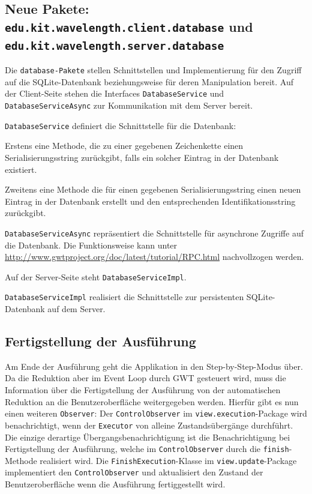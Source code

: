 \documentclass[parskip=full,11pt]{scrartcl}
\begin{document}
\subsection[Hinzugefügte Pakete]{Neue Pakete: \texttt{edu.kit.wavelength.client.database} und \texttt{edu.kit.wavelength.server.database}}

Die \texttt{database-Pakete} stellen Schnittstellen und Implementierung für den Zugriff auf die SQLite-Datenbank beziehungsweise für deren Manipulation bereit.
Auf der Client-Seite stehen die Interfaces \texttt{DatabaseService} und \texttt{DatabaseServiceAsync} zur Kommunikation mit dem Server bereit.

\texttt{DatabaseService} definiert die Schnittstelle für die Datenbank:

Erstens eine Methode, die zu einer gegebenen Zeichenkette einen Serialisierungsstring zurückgibt,
falls ein solcher Eintrag in der Datenbank existiert.

Zweitens eine Methode die für einen gegebenen Serialisierungsstring einen neuen Eintrag in der Datenbank erstellt und den entsprechenden Identifikationsstring zurückgibt.

\texttt{DatabaseServiceAsync} repräsentiert die Schnittstelle für asynchrone Zugriffe auf die Datenbank.
Die Funktionsweise kann unter \href{http://www.gwtproject.org/doc/latest/tutorial/RPC.html}{http://www.gwtproject.org/doc/latest/tutorial/RPC.html} nachvollzogen werden.

Auf der Server-Seite steht \texttt{DatabaseServiceImpl}.

\texttt{DatabaseServiceImpl} realisiert die Schnittstelle zur persistenten SQLite-Datenbank auf dem Server.
\subsection{Fertigstellung der Ausführung}
Am Ende der Ausführung geht die Applikation in den Step-by-Step-Modus über. Da die Reduktion aber im Event Loop durch GWT gesteuert wird, muss die Information über die Fertigstellung der Ausführung von der automatischen Reduktion an die Benutzeroberfläche weitergegeben werden.
Hierfür gibt es nun einen weiteren \texttt{Observer}: Der \texttt{ControlObserver} im \texttt{view.execution}-Package wird benachrichtigt, wenn der \texttt{Executor} von alleine Zustandsübergänge durchführt.
Die einzige derartige Übergangsbenachrichtigung ist die Benachrichtigung bei Fertigstellung der Ausführung, welche im \texttt{ControlObserver} durch die \texttt{finish}-Methode realisiert wird.
Die \texttt{FinishExecution}-Klasse im \texttt{view.update}-Package implementiert den \texttt{ControlObserver} und aktualisiert den Zustand der Benutzeroberfläche wenn die Ausführung fertiggestellt wird.
\end{document}
